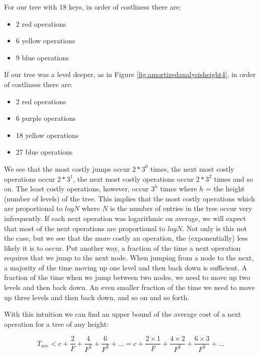 For our tree with 18 keys, in order of costliness there are:

    \begin{itemize}
        \item 2 red operations
        \item 6 yellow operations
        \item 9 blue operations
    \end{itemize}

If our tree was a level deeper, as in Figure \ref{fig:amortizedanalysisheight4}, in order of costliness there are:

    \begin{itemize}
        \item 2 red operations
        \item 6 purple operations
        \item 18 yellow operations
        \item 27 blue operations
    \end{itemize}
    
We see that the most costly jumps occur $2 * 3^0$ times, the next most costly operations occur $2 * 3^1$, the next most costly operations occur $2 * 3^2$ times and so on. The least costly operations, however, occur $3^h$ times where $h$ = the height (number of levels) of the tree. This implies that the most costly operations which are proportional to $log N$ where $N$ is the number of entries in the tree occur very infrequently. If each next operation was logarithmic on average, we will expect that most of the next operations are proportional to $log N$. Not only is this not the case, but we see that the more costly an operation, the (exponentially) less likely it is to occur. Put another way, a fraction of the time a next operation requires that we jump to the next node.  When jumping from a node to the next, a majority of the time moving up one level and then back down is sufficient. A fraction of the time when we jump between two nodes, we need to move up two levels and then back down. An even smaller fraction of the time we need to move up three levels and then back down, and so on and so forth.  

With this intuition we can find an upper bound of the average cost of a next operation for a tree of any height:

\begin{equation} \label{eq:TnextaveExp1}
    T_{ave} < c + \frac{2}{F} + \frac{4}{F^2} + \frac{6}{F^3} + ... = c + \frac{2 \times 1}{F} + \frac{4 \times 2}{F^2} + \frac{6 \times 3}{F^3} + ...
\end{equation}

